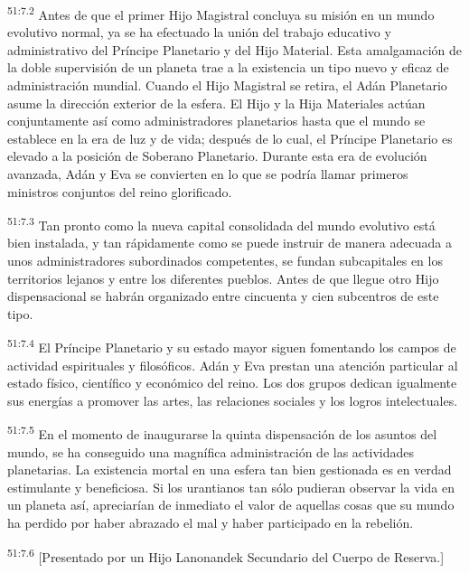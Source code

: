 \par
\textsuperscript{51:7.2} Antes de que el primer Hijo Magistral concluya su misión en un mundo evolutivo normal, ya se ha efectuado la unión del trabajo educativo y administrativo del Príncipe Planetario y del Hijo Material. Esta amalgamación de la doble supervisión de un planeta trae a la existencia un tipo nuevo y eficaz de administración mundial. Cuando el Hijo Magistral se retira, el Adán Planetario asume la dirección exterior de la esfera. El Hijo y la Hija Materiales actúan conjuntamente así como administradores planetarios hasta que el mundo se establece en la era de luz y de vida; después de lo cual, el Príncipe Planetario es elevado a la posición de Soberano Planetario. Durante esta era de evolución avanzada, Adán y Eva se convierten en lo que se podría llamar primeros ministros conjuntos del reino glorificado.

\par
\textsuperscript{51:7.3} Tan pronto como la nueva capital consolidada del mundo evolutivo está bien instalada, y tan rápidamente como se puede instruir de manera adecuada a unos administradores subordinados competentes, se fundan subcapitales en los territorios lejanos y entre los diferentes pueblos. Antes de que llegue otro Hijo dispensacional se habrán organizado entre cincuenta y cien subcentros de este tipo.

\par
\textsuperscript{51:7.4} El Príncipe Planetario y su estado mayor siguen fomentando los campos de actividad espirituales y filosóficos. Adán y Eva prestan una atención particular al estado físico, científico y económico del reino. Los dos grupos dedican igualmente sus energías a promover las artes, las relaciones sociales y los logros intelectuales.

\par
\textsuperscript{51:7.5} En el momento de inaugurarse la quinta dispensación de los asuntos del mundo, se ha conseguido una magnífica administración de las actividades planetarias. La existencia mortal en una esfera tan bien gestionada es en verdad estimulante y beneficiosa. Si los urantianos tan sólo pudieran observar la vida en un planeta así, apreciarían de inmediato el valor de aquellas cosas que su mundo ha perdido por haber abrazado el mal y haber participado en la rebelión.

\par
\textsuperscript{51:7.6} [Presentado por un Hijo Lanonandek Secundario del Cuerpo de Reserva.]